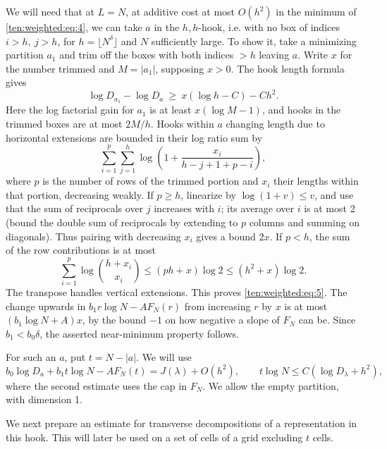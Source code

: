 We will need that at \(L=N\), at additive cost at most \(O(h^2)\) in the minimum of \eqref{ten:weighted:eq:4}, we can take \(a\) in the \(h,h\)-hook, i.e. with no box of indices \(i>h,\ j>h\), for \(h=\lfloor N^\delta\rfloor\) and \(N\) sufficiently large. To show it, take a minimizing partition \(a_1\) and trim off the boxes with both indices \(>h\) leaving \(a\). Write \(x\) for the number trimmed and \(M=|a_1|\), supposing \(x>0\). The hook length formula gives
\begin{equation}
 \log D_{a_1}-\log D_a \ \ge\ x(\log h-C)-C h^2.                                            \label{ten:weighted:eq:5}
\end{equation}
Here the log factorial gain for \(a_1\) is at least \(x(\log M-1)\), and hooks in the trimmed boxes are at most \(2M/h\). Hooks within \(a\) changing length due to horizontal extensions are bounded in their log ratio sum by
\[
 \sum_{i=1}^{p}\sum_{j=1}^{h}\log\left(1+\frac{x_i}{h-j+1+p-i}\right),
\]
where \(p\) is the number of rows of the trimmed portion and \(x_i\) their lengths within that portion, decreasing weakly. If \(p\ge h\), linearize by \(\log(1+v)\le v\), and use that the sum of reciprocals over \(j\) increases with \(i\); its average over \(i\) is at most 2 (bound the double sum of reciprocals by extending to \(p\) columns and summing on diagonals). Thus pairing with decreasing \(x_i\) gives a bound \(2x\). If \(p<h\), the sum of the row contributions is at most
\[
 \sum_{i=1}^p\log\binom{h+x_i}{x_i}
 \le (ph+x)\log2\le(h^2+x)\log2.
\]
The transpose handles vertical extensions. This proves \eqref{ten:weighted:eq:5}. The change upwards in \(b_1 r\log N-A F_N(r)\) from increasing \(r\) by \(x\) is at most \((b_1\log N+A)x\), by the bound \(-1\) on how negative a slope of \(F_N\) can be. Since \(b_1<b_0\delta\), the asserted near-minimum property follows.

For such an \(a\), put \(t=N-|a|\). We will use
\begin{equation}
 b_0\log D_a + b_1 t\log N-A F_N(t)=J(\lambda)+O(h^2),\qquad
 t\log N\le C(\log D_\lambda+h^2),                                                        \label{ten:weighted:eq:6}
\end{equation}
where the second estimate uses the cap in \(F_N\). We allow the empty partition, with dimension 1.

We next prepare an estimate for transverse decompositions of a representation in this hook. This will later be used on a set of cells of a grid excluding \(t\) cells.


